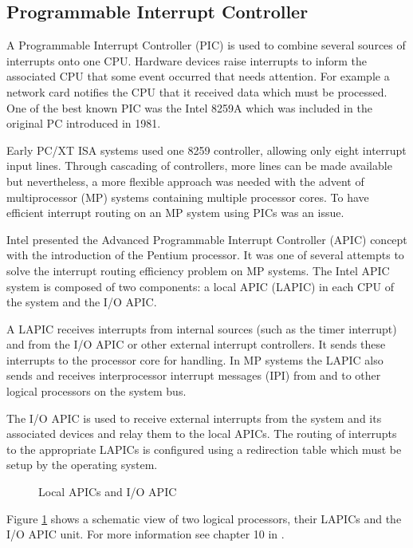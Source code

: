 \subsection{Programmable Interrupt Controller}
A Programmable Interrupt Controller (PIC) is used to combine several
sources of interrupts onto one CPU. Hardware devices raise interrupts to inform
the associated CPU that some event occurred that needs attention.  For example
a network card notifies the CPU that it received data which must be processed.
One of the best known PIC was the Intel 8259A which was included in the
original PC introduced in 1981.

Early PC/XT ISA systems used one 8259 controller, allowing only eight interrupt
input lines. Through cascading of controllers, more lines can be made available
but nevertheless, a more flexible approach was needed with the advent of
multiprocessor (MP) systems containing multiple processor cores. To
have efficient interrupt routing on an MP system using PICs was an issue.

Intel presented the Advanced Programmable Interrupt Controller
(APIC) concept with the introduction of the Pentium processor. It
was one of several attempts to solve the interrupt routing efficiency problem
on MP systems. The Intel APIC system is composed of two components: a local
APIC (LAPIC) in each CPU of the system and the I/O APIC.

A LAPIC receives interrupts from internal sources (such as the timer interrupt)
and from the I/O APIC or other external interrupt controllers. It sends these
interrupts to the processor core for handling. In MP systems the LAPIC also
sends and receives interprocessor interrupt messages (IPI) from and
to other logical processors on the system bus.

The I/O APIC is used to receive external interrupts from the system and its
associated devices and relay them to the local APICs. The routing of interrupts
to the appropriate LAPICs is configured using a redirection table which must be
setup by the operating system.

\begin{figure}[h]
	\centering
	
	\caption{Local APICs and I/O APIC}
	\label{fig:apic}
\end{figure}

Figure \ref{fig:apic} shows a schematic view of two logical processors, their
LAPICs and the I/O APIC unit. For more information see chapter 10 in
\cite{IntelSDM}.
